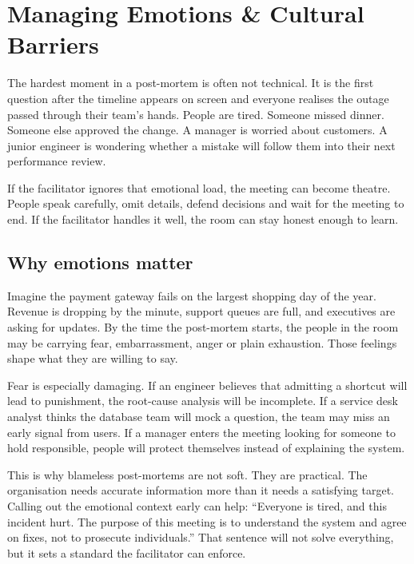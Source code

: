 \section{Managing Emotions \& Cultural Barriers}
The hardest moment in a post-mortem is often not technical. It is the first question after the timeline appears on screen and everyone realises the outage passed through their team's hands. People are tired. Someone missed dinner. Someone else approved the change. A manager is worried about customers. A junior engineer is wondering whether a mistake will follow them into their next performance review.


If the facilitator ignores that emotional load, the meeting can become theatre. People speak carefully, omit details, defend decisions and wait for the meeting to end. If the facilitator handles it well, the room can stay honest enough to learn.



\subsection{Why emotions matter}


Imagine the payment gateway fails on the largest shopping day of the year. Revenue is dropping by the minute, support queues are full, and executives are asking for updates. By the time the post-mortem starts, the people in the room may be carrying fear, embarrassment, anger or plain exhaustion. Those feelings shape what they are willing to say.


Fear is especially damaging. If an engineer believes that admitting a shortcut will lead to punishment, the root-cause analysis will be incomplete. If a service desk analyst thinks the database team will mock a question, the team may miss an early signal from users. If a manager enters the meeting looking for someone to hold responsible, people will protect themselves instead of explaining the system.


This is why blameless post-mortems are not soft. They are practical. The organisation needs accurate information more than it needs a satisfying target. Calling out the emotional context early can help: ``Everyone is tired, and this incident hurt. The purpose of this meeting is to understand the system and agree on fixes, not to prosecute individuals.'' That sentence will not solve everything, but it sets a standard the facilitator can enforce.



